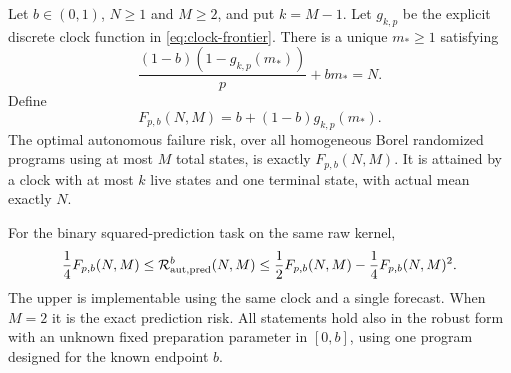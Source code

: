 \begin{theorem}\label{thm:rare-memory}
Let $b\in(0,1)$, $N\ge1$ and $M\ge2$, and put $k=M-1$. Let $g_{k,p}$ be the explicit discrete clock function in \eqref{eq:clock-frontier}. There is a unique $m_*\ge1$ satisfying
\begin{equation}\label{eq:rare-root}
 \frac{(1-b)(1-g_{k,p}(m_*))}{p}+bm_*=N.
\end{equation}
Define
\begin{equation}\label{eq:rare-profile}
 F_{p,b}(N,M)=b+(1-b)g_{k,p}(m_*).
\end{equation}
The optimal autonomous failure risk, over all homogeneous Borel randomized programs using at most $M$ total states, is exactly $F_{p,b}(N,M)$. It is attained by a clock with at most $k$ live states and one terminal state, with actual mean exactly $N$.

For the binary squared-prediction task on the same raw kernel,
\begin{equation}\label{eq:rare-prediction}
 \frac14 F_{p,b}(N,M)
 \le\mathcal R_{\mathrm{aut},\mathrm{pred}}^b(N,M)
 \le\frac12 F_{p,b}(N,M)-\frac14F_{p,b}(N,M)^2.
\end{equation}
The upper is implementable using the same clock and a single forecast. When $M=2$ it is the exact prediction risk. All statements hold also in the robust form with an unknown fixed preparation parameter in $[0,b]$, using one program designed for the known endpoint $b$.
\end{theorem}
